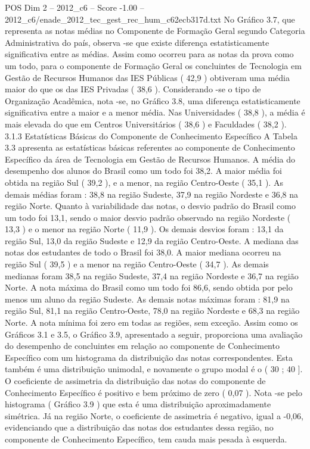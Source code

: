 \begin{textsample}{POS Dim 2 – 2012\_c6 – Score -1.00 – 2012\_c6/enade\_2012\_tec\_gest\_rec\_hum\_c62ecb317d.txt}
No Gráfico 3.7, que representa as notas médias no Componente de Formação Geral segundo Categoria Administrativa do país, observa -se que existe diferença estatisticamente significativa entre as médias.
Assim como ocorreu para as notas da prova como um todo, para o componente de Formação Geral os concluintes de Tecnologia em Gestão de Recursos Humanos das IES Públicas ( 42,9 ) obtiveram uma média maior do que os das IES Privadas ( 38,6 ).
Considerando -se o tipo de Organização Acadêmica, nota -se, no Gráfico 3.8, uma diferença estatisticamente significativa entre a maior e a menor média.
Nas Universidades ( 38,8 ), a média é mais elevada do que em Centros Universitários ( 38,6 ) e Faculdades ( 38,2 ). 3.1.3 Estatísticas Básicas do Componente de Conhecimento Específico A Tabela 3.3 apresenta as estatísticas básicas referentes ao componente de Conhecimento Específico da área de Tecnologia em Gestão de Recursos Humanos.
A média do desempenho dos alunos do Brasil como um todo foi 38,2.
A maior média foi obtida na região Sul ( 39,2 ), e a menor, na região Centro-Oeste ( 35,1 ).
As demais médias foram : 38,8 na região Sudeste, 37,9 na região Nordeste e 36,8 na região Norte.
Quanto à variabilidade das notas, o desvio padrão do Brasil como um todo foi 13,1, sendo o maior desvio padrão observado na região Nordeste ( 13,3 ) e o menor na região Norte ( 11,9 ).
Os demais desvios foram : 13,1 da região Sul, 13,0 da região Sudeste e 12,9 da região Centro-Oeste.
A mediana das notas dos estudantes de todo o Brasil foi 38,0.
A maior mediana ocorreu na região Sul ( 39,5 ) e a menor na região Centro-Oeste ( 34,7 ).
As demais medianas foram 38,5 na região Sudeste, 37,4 na região Nordeste e 36,7 na região Norte.
A nota máxima do Brasil como um todo foi 86,6, sendo obtida por pelo menos um aluno da região Sudeste.
As demais notas máximas foram : 81,9 na região Sul, 81,1 na região Centro-Oeste, 78,0 na região Nordeste e 68,3 na região Norte.
A nota mínima foi zero em todas as regiões, sem exceção.
Assim como os Gráficos 3.1 e 3.5, o Gráfico 3.9, apresentado a seguir, proporciona uma avaliação do desempenho de concluintes em relação ao componente de Conhecimento Específico com um histograma da distribuição das notas correspondentes.
Esta também é uma distribuição unimodal, e novamente o grupo modal é o ( 30 ; 40 ].
O coeficiente de assimetria da distribuição das notas do componente de Conhecimento Específico é positivo e bem próximo de zero ( 0,07 ).
Nota -se pelo histograma ( Gráfico 3.9 ) que esta é uma distribuição aproximadamente simétrica.
Já na região Norte, o coeficiente de assimetria é negativo, igual a -0,06, evidenciando que a distribuição das notas dos estudantes dessa região, no componente de Conhecimento Específico, tem cauda mais pesada à esquerda.

\end{textsample}
